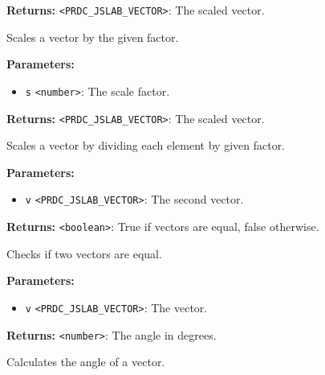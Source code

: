 \documentclass[12pt,a4paper]{article}
\begin{document}
\noindent \textbf{Returns:} \texttt{<PRDC\_JSLAB\_VECTOR>}: The scaled vector.

\noindent Scales a vector by the given factor.

\vspace{5mm}
\noindent {}


\noindent \textbf{Parameters:}
\begin{itemize}
  \item \texttt{s} \texttt{<number>}: The scale factor.
\end{itemize}

\noindent \textbf{Returns:} \texttt{<PRDC\_JSLAB\_VECTOR>}: The scaled vector.

\noindent Scales a vector by dividing each element by given factor.

\vspace{5mm}
\noindent {}


\noindent \textbf{Parameters:}
\begin{itemize}
  \item \texttt{v} \texttt{<PRDC\_JSLAB\_VECTOR>}: The second vector.
\end{itemize}

\noindent \textbf{Returns:} \texttt{<boolean>}: True if vectors are equal, false otherwise.

\noindent Checks if two vectors are equal.

\vspace{5mm}
\noindent {}


\noindent \textbf{Parameters:}
\begin{itemize}
  \item \texttt{v} \texttt{<PRDC\_JSLAB\_VECTOR>}: The vector.
\end{itemize}

\noindent \textbf{Returns:} \texttt{<number>}: The angle in degrees.

\noindent Calculates the angle of a vector.

\vspace{5mm}
\noindent {}
\end{document}
